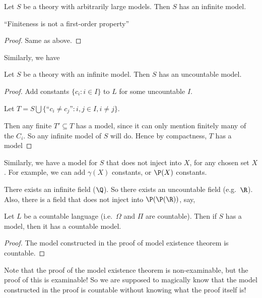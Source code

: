 \documentclass[a4paper]{article}
\begin{document}
\begin{cor}
  Let $S$ be a theory with arbitrarily large models. Then $S$ has an infinite model.

  ``Finiteness is not a first-order property''
\end{cor}

\begin{proof}
  Same as above.
\end{proof}

Similarly, we have
\begin{cor}
  Let $S$ be a theory with an infinite model. Then $S$ has an uncountable model.
\end{cor}

\begin{proof}
  Add constants $\{c_i: i\in I\}$ to $L$ for some uncountable $I$.

  Let $T = S\bigcup\{\text{``}c_i \not= c_j\text{''}: i, j\in I, i \not = j\}$.

  Then any finite $T' \subseteq T$ has a model, since it can only mention finitely many of the $C_i$. So any infinite model of $S$ will do. Hence by compactness, $T$ has a model
\end{proof}
Similarly, we have a model for $S$ that does not inject into $X$, for any chosen set $X$. For example, we can add $\gamma(X)$ constants, or $\P(X)$ constants.

\begin{eg}
  There exists an infinite field ($\Q$). So there exists an uncountable field (e.g.\ $\R$). Also, there is a field that does not inject into $\P(\P(\R))$, say,
\end{eg}

\begin{thm}
  Let $L$ be a countable language (i.e.\ $\Omega$ and $\Pi$ are countable). Then if $S$ has a model, then it has a countable model.
\end{thm}

\begin{proof}
  The model constructed in the proof of model existence theorem is countable.
\end{proof}
Note that the proof of the model existence theorem is non-examinable, but the proof of this is examinable! So we are supposed to magically know that the model constructed in the proof is countable without knowing what the proof itself is!
\end{document}
